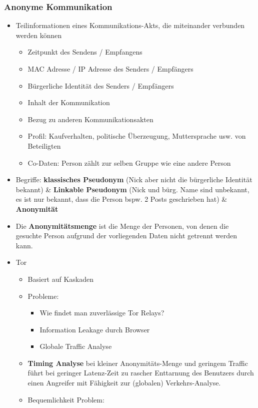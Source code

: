 \documentclass{article} %
\begin{document}
			\subsubsection{Anonyme Kommunikation}
			\begin{itemize} 
				\item Teilinformationen eines Kommunikations-Akts, die miteinander verbunden werden können
				\begin{itemize}
					\item Zeitpunkt des Sendens / Empfangens
					\item MAC Adresse / IP Adresse des Senders / Empfängers
					\item Bürgerliche Identität des Senders / Empfängers
					\item Inhalt der Kommunikation
					\item Bezug zu anderen Kommunikationsakten
					\item Profil: Kaufverhalten, politische Überzeugung, Muttersprache usw. von Beteiligten
					\item Co-Daten: Person zählt zur selben Gruppe wie eine andere Person
				\end{itemize}
				\item Begriffe: \textbf{klassisches Pseudonym} (Nick aber nicht die bürgerliche Identität bekannt) \& \textbf{Linkable Pseudonym} (Nick und bürg. Name sind unbekannt, es ist nur bekannt, dass die Person bspw. 2 Posts geschrieben hat) \& \textbf{Anonymität}
				\item Die \textbf{Anonymitätsmenge} ist die Menge der Personen, von denen die gesuchte Person aufgrund der vorliegenden Daten nicht getrennt werden kann.
				\item Tor
				\begin{itemize}
					\item Basiert auf Kaskaden
					\item Probleme: 
					\begin{itemize}
						\item Wie findet man zuverlässige Tor Relays?
						\item Information Leakage durch Browser
						\item Globale Traffic Analyse
					\end{itemize}
					\item \textbf{Timing Analyse} bei kleiner Anonymitäts-Menge und geringem Traffic führt bei geringer Latenz-Zeit zu rascher Enttarnung des Benutzers durch einen Angreifer mit Fähigkeit zur (globalen) Verkehrs-Analyse.
					\item Bequemlichkeit Problem:

\end{itemize}
\end{itemize}
\end{document}
